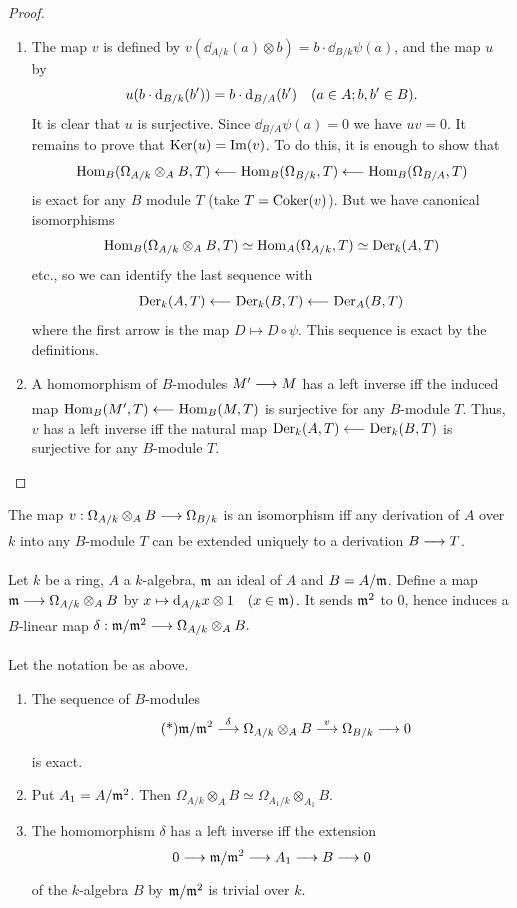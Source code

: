 \documentclass[../main]{subfiles}
\begin{document}
\begin{proof}
\begin{enumerate}
    \item The map $v$ is defined by $v(\dd_{A / k}(a) \otimes b)=b \cdot \dd_{B / k} \psi(a)$, and the map $u$ by \[u(b \cdot \dd_{B / k}(b'))=b \cdot \dd_{B / A}(b')\for{a \in A ; b, b' \in B}.\] It is clear that $u$ is surjective. Since $\dd_{B / A} \psi(a)=0$ we have $u v=0$. It remains to prove that $\operatorname{Ker}(u)=\operatorname{Im}(v)$. To do this, it is enough to show that \[\operatorname{Hom}_B(\Omega_{A/k} \otimes_A B, T)\longleftarrow\operatorname{Hom}_B(\Omega_{B/ k}, T)\longleftarrow\operatorname{Hom}_B(\Omega_{B / A}, T)\]
    is exact for any $B$ module $T$ (take $T=\operatorname{Coker}(v)$). But we have canonical isomorphisms \[\operatorname{Hom}_B(\Omega_{A/k}\otimes_A B, T) \simeq \operatorname{Hom}_A(\Omega_{A/k}, T) \simeq\operatorname{Der}_k(A, T)\] etc., so we can identify the last sequence with \[\operatorname{Der}_k(A, T)\longleftarrow\operatorname{Der}_k(B, T)\longleftarrow\operatorname{Der}_A(B, T)\] where the first arrow is the map $D \mapsto D \circ \psi$. This sequence is exact by the definitions.
    
    \item A homomorphism of $B$-modules $M' \varrightarrow{} M$ has a left inverse iff the induced map $\operatorname{Hom}_B(M', T)\longleftarrow\operatorname{Hom}_B(M, T)$ is surjective for any $B$-module $T$. Thus, $v$ has a left inverse iff the natural map $\operatorname{Der}_k(A, T)\longleftarrow\operatorname{Der}_k(B, T)$ is surjective for any $B$-module $T$.
\end{enumerate}
\end{proof}

\begin{corollary}\label{cor:26.01}
The map $v: \Omega_{A / k} \otimes_A B \varrightarrow{} \Omega_{B / k}$ is an isomorphism iff any derivation of $A$ over $k$ into any $B$-module $T$ can be extended uniquely to a derivation $B \varrightarrow{} T$.
\end{corollary}
 
\newparagraph Let $k$ be a ring, $A$ a $k$-algebra, $\mathfrak{m}$ an ideal of $A$ and $B=A / \mathfrak{m}$. Define a map $\ideal{m} \varrightarrow{} \Omega_{A/k} \otimes_A B$ by $x \mapsto \dd_{A / k} x \otimes 1\for{x \in \ideal{m}}$. It sends $\mathfrak{m}^2$ to $0$, hence induces a $B$-linear map $\delta: \ideal{m}/\ideal{m}^2 \varrightarrow{} \Omega_{A/k}\otimes_A B.$

\begin{theorem}\label{thm:058}
Let the notation be as above.
\begin{enumerate}
    \item The sequence of $B$-modules \[\tag{*}\label{eqn:26.*} \ideal{m}/\ideal{m}^2 \varrightarrow{\delta}\Omega_{A/k}\otimes_AB \varrightarrow{v}\Omega_{B/k} \varrightarrow{}0\] is exact.
    \item Put $A_1 =A/\mathfrak{m}^2$. Then $\Omega_{A/k} \otimes_A B \simeq \Omega_{A_1/k}\otimes_{A_1}B.$
    \item The homomorphism $\delta$ has a left inverse iff the extension
\[0 \varrightarrow{} \ideal{m} / \ideal{m}^2\varrightarrow{}A_1 \varrightarrow{} B \varrightarrow{} 0\] of the $k$-algebra $B$ by $\mathfrak{m}/\mathfrak{m}^2$ is trivial over $k$.
\end{enumerate}
\end{theorem}
\end{document}
